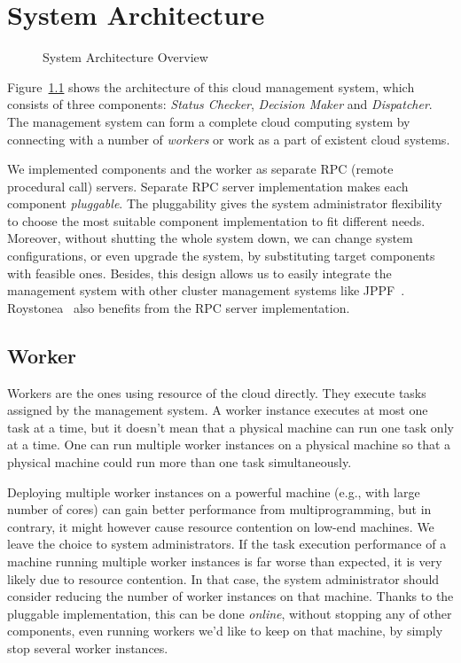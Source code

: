 \chapter{System Architecture}


\begin{figure}
  \centering
  
  \caption{System Architecture Overview}
  \label{fig:archi-overview}
\end{figure}

Figure~\ref{fig:archi-overview} shows the architecture of this cloud
management system, which consists of three components: \emph{Status
Checker}, \emph{Decision Maker} and \emph{Dispatcher}.  The management
system can form a complete cloud computing system by connecting with a
number of \emph{workers} or work as a part of existent cloud systems.

We implemented components and the worker as separate RPC (remote
procedural call) servers.  Separate RPC server implementation makes each
component \emph{pluggable}.  The pluggability gives the system
administrator flexibility to choose the most suitable component
implementation to fit different needs.  Moreover, without shutting the
whole system down, we can change system configurations, or even upgrade
the system,  by substituting target components with feasible ones.
Besides, this design allows us to easily integrate the management system
with other cluster management systems like JPPF~\cite{cite:JPPF}.
Roystonea~\cite{cite:roystonea} also benefits from the RPC server
implementation.




\section{Worker}

Workers are the ones using resource of the cloud directly.  They execute
tasks assigned by the management system.  A worker instance executes at
most one task at a time, but it doesn't mean that a physical machine can
run one task only at a time.  One can run multiple worker instances on a
physical machine so that a physical machine could run more than one task
simultaneously.	 

Deploying multiple worker instances on a powerful machine (e.g., with
large number of cores) can gain better performance from
multiprogramming, but in contrary, it might however cause resource
contention on low-end machines.  We leave the choice to system
administrators.  If the task execution performance of a machine running
multiple worker instances is far worse than expected, it is very likely
due to resource contention.  In that case, the system administrator
should consider reducing the number of worker instances on that machine.
Thanks to the pluggable implementation, this can be done \emph{online},
without stopping any of other components, even running workers we'd like
to keep on that machine, by simply stop several worker instances.

